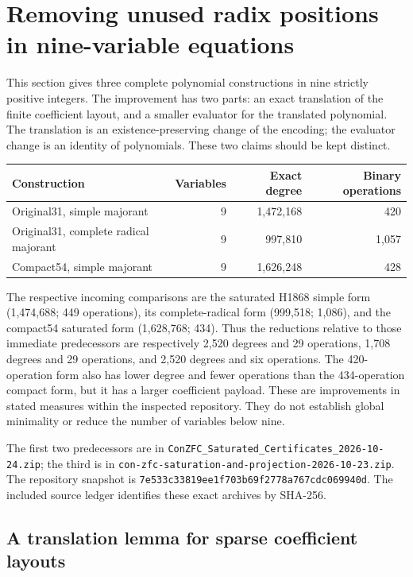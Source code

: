 \section{Removing unused radix positions in nine-variable equations}
\label{sec:radix-origin}

This section gives three complete polynomial constructions in nine strictly
positive integers.  The improvement has two parts: an exact translation of
the finite coefficient layout, and a smaller evaluator for the translated
polynomial.  The translation is an existence-preserving change of the
encoding; the evaluator change is an identity of polynomials.  These two
claims should be kept distinct.

\begin{center}
\begin{tabular}{lrrr}
\hline
Construction & Variables & Exact degree & Binary operations\\
\hline
Original31, simple majorant &9&1,472,168&420\\
Original31, complete radical majorant &9&997,810&1,057\\
Compact54, simple majorant &9&1,626,248&428\\
\hline
\end{tabular}
\end{center}

The respective incoming comparisons are the saturated H1868 simple form
(1,474,688; 449 operations), its complete-radical form (999,518; 1,086), and
the compact54 saturated form (1,628,768; 434).  Thus the reductions relative
to those immediate predecessors are respectively 2,520 degrees and 29
operations, 1,708 degrees and 29 operations, and 2,520 degrees and six
operations.  The 420-operation form also has lower degree and fewer
operations than the 434-operation compact form, but it has a larger
coefficient payload.  These are improvements in stated measures within the
inspected repository.  They do not establish global minimality or reduce
the number of variables below nine.

The first two predecessors are in
\texttt{ConZFC\_Saturated\_Certificates\_2026-10-24.zip}; the third is in
\texttt{con-zfc-saturation-and-projection-2026-10-23.zip}.
The repository snapshot is
\texttt{7e533c33819ee1f703b69f2778a767cdc069940d}.
The included source ledger identifies these exact archives by SHA-256.

\subsection{A translation lemma for sparse coefficient layouts}

